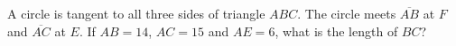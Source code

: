 A circle is tangent to all three sides of triangle $ABC$. The circle meets $\overline{AB}$ at $F$ and $\overline{AC}$ at $E$. If $AB=14$, $AC=15$ and $AE=6$, what is the length of $BC$?
